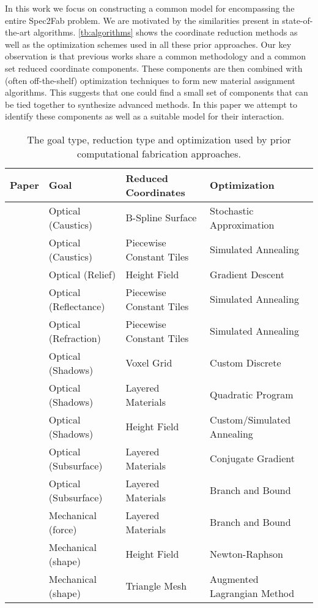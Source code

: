 In this work we focus on constructing a common model for encompassing the entire Spec2Fab problem. We are motivated by the similarities present in state-of-the-art algorithms.  \autoref{tb:algorithms} shows the coordinate reduction methods as well as the optimization schemes used in all these prior approaches. Our key observation is that previous works share a common methodology and  a common set reduced coordinate components. These components are then combined with (often off-the-shelf) optimization techniques to form new material assignment algorithms. This suggests that one could find a small set of components that can be tied together to synthesize  advanced methods. In this paper we attempt to identify these components as well as a suitable model for their interaction.


\begin{table*}[htp]
\centering
\begin{tabular}{clll}
\hline
\textbf{Paper} & \textbf{Goal} & \textbf{Reduced Coordinates}  & \textbf{Optimization} \\
\hline
~\cite{Finckh:2010} & Optical (Caustics) & B-Spline Surface & Stochastic Approximation \\
~\cite{Marios:2011} & Optical (Caustics) & Piecewise Constant Tiles & Simulated Annealing \\
~\cite{Alexa:2010:RAI}& Optical (Relief) & Height Field & Gradient Descent\\
~\cite{Weyrich:2009:FMF} &Optical (Reflectance)&Piecewise Constant Tiles& Simulated Annealing\\
~\cite{Papas:2012} & Optical (Refraction) & Piecewise Constant Tiles & Simulated Annealing \\
~\cite{Mitra:2009:SA}&Optical (Shadows)&Voxel Grid&Custom Discrete\\
~\cite{Baran:2012:MLA}&Optical (Shadows)& Layered Materials & Quadratic Program \\
~\cite{Bermano:2012} & Optical (Shadows) & Height Field & Custom/Simulated Annealing \\
~\cite{Dong:2010:FSS}&Optical (Subsurface) &Layered Materials&Conjugate Gradient\\
~\cite{Hasan:2010:PRO}& Optical (Subsurface) & Layered Materials & Branch and Bound\\
~\cite{Bickel:2010:DAF}& Mechanical (force) & Layered Materials  & Branch and Bound \\
~\cite{Bickel:2012} & Mechanical (shape) &  Height Field &  Newton-Raphson \\
~\cite{sko:2012}& Mechanical (shape) & Triangle Mesh & Augmented Lagrangian Method \\
\hline
\end{tabular}
\caption{The goal type, reduction type and optimization used by prior computational fabrication approaches.}
\label{tb:algorithms}
\end{table*}